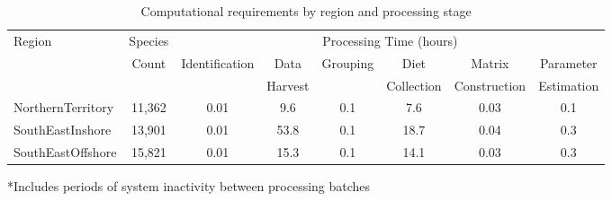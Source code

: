 \begin{table}[htbp]
\centering
\footnotesize
\caption{Computational requirements by region and processing stage}
\label{tab:timing_analysis}
\begin{tabular}{lccccccc}
\hline
Region & Species & \multicolumn{6}{c}{Processing Time (hours)} \\
\cline{3-8}
 & Count & Identification & Data & Grouping & Diet & Matrix & Parameter \\
 & & & Harvest & & Collection & Construction & Estimation \\
\hline
NorthernTerritory & 11,362 & 0.01 & 9.6 & 0.1 & 7.6 & 0.03 & 0.1 \\
SouthEastInshore & 13,901 & 0.01 & 53.8\* & 0.1 & 18.7 & 0.04 & 0.3 \\
SouthEastOffshore & 15,821 & 0.01 & 15.3 & 0.1 & 14.1 & 0.03 & 0.3 \\
\hline
\end{tabular}
\vspace{1ex}
\raggedright\footnotesize{*Includes periods of system inactivity between processing batches}
\end{table}
